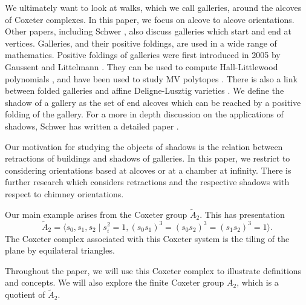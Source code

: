 \documentclass[11pt]{article}
\begin{document}
We ultimately want to look at walks, which we call galleries, around the alcoves of Coxeter complexes. In this paper, we focus on alcove to alcove orientations. Other papers, including Schwer \cite{WILD}, also discuss galleries which start and end at vertices. Galleries, and their positive foldings, are used in a wide range of mathematics. Positive foldings of galleries were first introduced in 2005 by Gaussent and Littelmann \cite{LSGAL}. They can be used to compute Hall-Littlewood polynomials \cite{HL}, and have been used to study MV polytopes \cite{MVPOLY}. There is also a link between folded galleries and affine Deligne-Lusztig varieties \cite{DEL}. We define the shadow of a gallery as the set of end alcoves which can be reached by a positive folding of the gallery. For a more in depth discussion on the applications of shadows, Schwer has written a detailed paper \cite{WILD}.

Our motivation for studying the objects of shadows is the relation between retractions of buildings and shadows of galleries. In this paper, we restrict to considering orientations based at alcoves or at a chamber at infinity. There is further research \cite{NAQVI} which considers retractions and the respective shadows with respect to chimney orientations.

 

Our main example arises from the Coxeter group $\tilde{A}_2$. This has presentation
\[\tilde{A}_2=\langle s_0,s_1,s_2\mid s_i^2=1, (s_0s_1)^3=(s_0s_2)^3=(s_1s_2)^3=1\rangle.\]
The Coxeter complex associated with this Coxeter system is the tiling of the plane by equilateral triangles. 


Throughout the paper, we will use this Coxeter complex to illustrate definitions and concepts. We will also explore the finite Coxeter group $A_2$, which is a quotient of $\tilde{A}_2$. 
\end{document}
